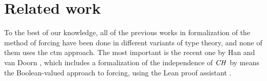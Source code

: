 \section{Related work}
\label{sec:related-work}

To the best of our knowledge, all of the previous works in
formalization of the method 
of forcing have been done in different variants of type theory, and
none of them uses the ctm approach. The
most important is the recent one by 
Han and van Doorn
\cite{han_et_al:LIPIcs:2019:11074,DBLP:conf/cpp/HanD20}, which includes
a formalization of the independence of $\mathit{CH}$ by means
the Boolean-valued approach to forcing, using the Lean
proof assistant \cite{DBLP:conf/cade/MouraKADR15}.


